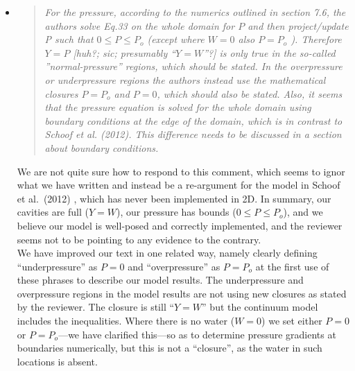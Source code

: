 \documentclass[11pt,reqno]{amsart}
\newcommand{\reply}[2]{
\medskip\medskip
\item  \begin{quote}
\emph{#1}
\end{quote}

\medskip
\noindent #2}
\begin{document}
\begin{itemize}
\reply{For the pressure, according to the numerics outlined in section 7.6, the authors solve Eq.33 on the whole domain for $P$ and then project/update P such that $0 \le P \le P_o$ (except where $W = 0$ also $P = P_o$ ).  Therefore $Y = P$ [huh?; sic; presumably ``$Y=W$''?] is only true in the so-called ''normal-pressure'' regions, which should be stated. In the overpressure or underpressure regions the authors instead use the mathematical closures $P = P_o$ and $P = 0$, which should also be stated.  Also, it seems that the pressure equation is solved for the whole domain using boundary conditions at the edge of the domain, which is in contrast to Schoof et al. (2012). This difference needs to be discussed in a section about boundary conditions.}
{We are not quite sure how to respond to this comment, which seems to ignor what we have written and instead be a re-argument for the model in Schoof et al.~(2012) \cite{Schoofetal2012}, which has never been implemented in 2D.  In summary, our cavities are full ($Y=W$), our pressure has bounds ($0\le P \le P_o$), and we believe our model is well-posed and correctly implemented, and the reviewer seems not to be pointing to any evidence to the contrary. \\
\indent We have improved our text in one related way, namely clearly defining ``underpressure'' as $P=0$ and ``overpressure'' as $P= P_o$ at the first use of these phrases to describe our model results.  The underpressure and overpressure regions in the model results are not using new closures as stated by the reviewer.  The closure is still ``$Y=W$'' but the continuum model includes the inequalities.   Where there is no water ($W=0$) we set either $P=0$ or $P=P_o$---we have clarified this---so as to determine pressure gradients at boundaries numerically, but this is not a ``closure'', as the water in such locations is absent.}


\end{itemize}
\end{document}
